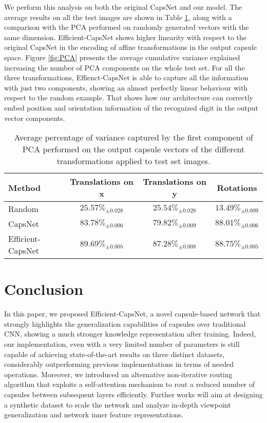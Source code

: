 \documentclass{article}
\begin{document}
We perform this analysis on both the original CapsNet \cite{sabour2017dynamic} and our model. The average results on all the test images are shown in Table \ref{tab:PCA}, along with a comparison with the PCA performed on randomly generated vectors with the same dimension. Efficient-CapsNet shows higher linearity with respect to the original CapsNet in the encoding of affine transformations in the output capsule space. Figure \ref{fig:PCA} presents the average cumulative variance explained increasing the number of PCA components on the whole test set. For all the three transformations, Effienct-CapsNet is able to capture all the information with just two components, showing an almost perfectly linear behaviour with respect to the random example. That shows how our architecture can correctly embed position and orientation information of the recognized digit in the output vector components.  


\begin{table}[h]
\centering
\begin{tabular}{lccc}
\toprule
Method    & Translations on x   & Translations on y   & Rotations   \\ \hline
Random                           & $25.57\%_{\pm0.028}$   & $25.54\%_{\pm0.028}$             & $13.49\%_{\pm0.009}$  \\ 
CapsNet \cite{sabour2017dynamic} & $83.78\%_{\pm0.006}$        & $79.82\%_{\pm0.009}$              & $88.01\%_{\pm0.006}$  \\ 
Efficient-CapsNet                & $89.69\%_{\pm0.005}$        & $87.28\%_{\pm0.008}$              & $88.75\%_{\pm0.005}$  \\ \bottomrule
\end{tabular}
\caption{Average percentage of variance captured by the first component of PCA performed on the output capsule vectors of the different transformations applied to test set images.}
\label{tab:PCA}
\end{table}

\section{Conclusion}
In this paper, we proposed Efficient-CapsNet, a novel capsule-based network that strongly highlights the generalization capabilities of capsules over traditional CNN, showing a much stronger knowledge representation after training. Indeed, our implementation, even with a very limited number of parameters is still capable of achieving state-of-the-art results on three distinct datasets, considerably outperforming previous implementations in terms of needed operations. Moreover, we introduced an alternative non-iterative routing algorithm that exploits a self-attention mechanism to rout a reduced number of capsules between subsequent layers efficiently. Further works will aim at designing a synthetic dataset to scale the network and analyze in-depth viewpoint generalization and network inner feature representations.
\end{document}
